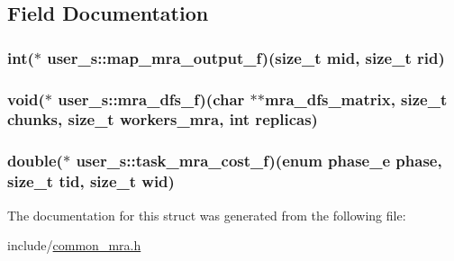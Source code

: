 \subsection{\-Field \-Documentation}
\hypertarget{structuser__s_ab9a47b1668a675fb95ca6489d1da13a7}{
\subsubsection[{map\-\_\-mra\-\_\-output\-\_\-f}]{\setlength{\rightskip}{0pt plus 5cm}int($\ast$ {\bf user\-\_\-s\-::map\-\_\-mra\-\_\-output\-\_\-f})(size\-\_\-t mid, size\-\_\-t rid)}}\label{structuser__s_ab9a47b1668a675fb95ca6489d1da13a7}
\hypertarget{structuser__s_a832e7d465f899e75aa7fe1d72987c5d2}{
\subsubsection[{mra\-\_\-dfs\-\_\-f}]{\setlength{\rightskip}{0pt plus 5cm}void($\ast$ {\bf user\-\_\-s\-::mra\-\_\-dfs\-\_\-f})(char $\ast$$\ast$mra\-\_\-dfs\-\_\-matrix, size\-\_\-t chunks, size\-\_\-t workers\-\_\-mra, int replicas)}}\label{structuser__s_a832e7d465f899e75aa7fe1d72987c5d2}
\hypertarget{structuser__s_aa32af3ea6ee92e53a04476911d65f2c1}{
\subsubsection[{task\-\_\-mra\-\_\-cost\-\_\-f}]{\setlength{\rightskip}{0pt plus 5cm}double($\ast$ {\bf user\-\_\-s\-::task\-\_\-mra\-\_\-cost\-\_\-f})(enum {\bf phase\-\_\-e} phase, size\-\_\-t tid, size\-\_\-t wid)}}\label{structuser__s_aa32af3ea6ee92e53a04476911d65f2c1}


\-The documentation for this struct was generated from the following file\-:\begin{DoxyCompactItemize}
\item 
include/\hyperlink{common__mra_8h}{common\-\_\-mra.\-h}\end{DoxyCompactItemize}

